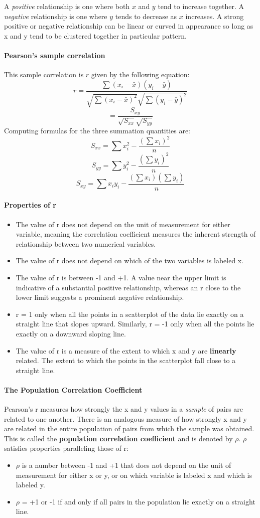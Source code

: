 \documentclass{article}
\newcommand{\p}[1]{\paragraph{#1}} %
\begin{document}
	A \textit{positive} relationship is one where both $x$ and $y$ tend to increase together. A 
	\textit{negative} relationship is one where $y$ tends to decrease as $x$ increases. A 
	strong positive or negative relationship can be linear or curved in appearance so long as x 
	and y tend to be clustered together in particular pattern.
		
	\p{Pearson's sample correlation}
		This sample correlation is $r$ given by the following equation:
		\[ r = \frac{\sum(x_i-\bar{x})(y_i-\bar{y})}{\sqrt{\sum(x_i-\bar{x})^2}\sqrt{\sum(y_i-\bar{y})^2}}  
		\]
		\[ = \frac{S_{xy}}{\sqrt{S_{xx}}\sqrt{S_{yy}}} \]
		Computing formulas for the three summation quantities are:
		\[ S_{xx} = \sum x_i^2-\frac{\left(\sum x_i\right)^2}{n} \]
		\[ S_{yy} = \sum y_i^2-\frac{\left(\sum y_i\right)^2}{n} \]
		\[ S_{xy} = \sum x_iy_i-\frac{\left(\sum x_i\right)\left(\sum y_i\right)}{n} \]
		
	\p{Properties of r}
		\begin{itemize}
			\item{The value of r does not depend on the unit of measurement for either variable, 
			meaning the correlation coefficient measures the inherent strength of relationship 
			between two numerical variables.}
		
			\item{The value of r does not depend on which of the two variables is labeled x.}
		
			\item{The value of r is between -1 and +1. A value near the upper limit is indicative of 
			a substantial positive relationship, whereas an r close to the lower limit suggests a 
			prominent negative relationship. }
		
			\item{r = 1 only when all the points in a scatterplot of the data lie exactly on a straight 
			line that slopes upward. Similarly, r = -1 only when all the points lie exactly on a 
			downward sloping line.}
		
			\item{The value of r is a measure of the extent to which x and y are \textbf{linearly} 
			related. The extent to which the points in the scatterplot fall close to a straight line.}
		\end{itemize}
		
	\p{The Population Correlation Coefficient}
		Pearson's r measures how strongly the x and y values in a \textit{sample} of pairs are 
		related to one another. There is an analogous measure of how strongly x and y are related 
		in the entire population of pairs from which the sample was obtained. This is called the 
		\textbf{population correlation coefficient} and is denoted by $\rho$. $\rho$ satisfies 
		properties paralleling those of r:
		\begin{itemize}
			\item{$\rho$ is a number between -1 and +1 that does not depend on the unit of 
			measurement for either x or y, or on which variable is labeled x and which is labeled 
			y}.
			\item{$\rho$ = +1 or -1 if and only if all pairs in the population lie exactly on a straight 
			line.}
		\end{itemize}
		
\end{document}
